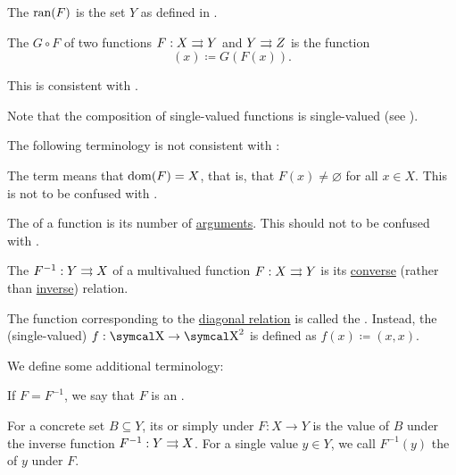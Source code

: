 \begin{definition}
\begin{DefEnum}[resume=def:function]
     The  \( \operatorname{ran}(F) \) is the set \( Y \) as defined in .

     The  \( G \circ F \) of two functions \( F: X \rightrightarrows Y \) and \( Y \rightrightarrows Z \) is the function
    \begin{equation*}
      [G \circ F](x) \coloneqq G(F(x)).
    \end{equation*}

    This is consistent with .

    Note that the composition of single-valued functions is single-valued (see ).
  \end{DefEnum}

  The following terminology is not consistent with :
  \begin{DefEnum}[resume=def:function]
     The term  means that \( \operatorname{dom}(F) = X \), that is, that \( F(x) \neq \varnothing \) for all \( x \in X \). This is not to be confused with .

     The  of a function is its number of \hyperref[def:function/arity]{arguments}. This should not to be confused with .

     The  \( F^{-1}: Y \rightrightarrows X \) of a multivalued function \( F: X \rightrightarrows Y \) is its \hyperref[def:binary_relation/converse]{converse} (rather than \hyperref[def:binary_relation/inverse]{inverse}) relation.

     The function corresponding to the \hyperref[def:binary_relation/diagonal]{diagonal relation} is called the . Instead, the (single-valued)  \( f: \CX \to \CX^2 \) is defined as \( f(x) \coloneqq (x, x) \).
  \end{DefEnum}

  We define some additional terminology:
  \begin{DefEnum}[resume=def:function]
     If \( F = F^{-1} \), we say that \( F \) is an .

     For a concrete set \( B \subseteq Y \), its  or simply  under \( F: X \to Y \) is the value of \( B \) under the inverse function \( F^{-1}: Y \rightrightarrows X \). For a single value \( y \in Y \), we call \( F^{-1}(y) \) the  of \( y \) under \( F \).


\end{DefEnum}
\end{definition}
